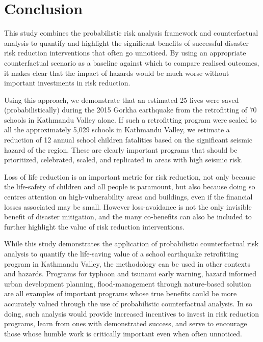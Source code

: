 \documentclass[utf8]{frontiersSCNS} %
\begin{document}
\section{Conclusion}
\label{section-conclusion}

This study combines the probabilistic risk analysis framework and counterfactual analysis to quantify and highlight the significant benefits of successful disaster risk reduction interventions that often go unnoticed. By using an appropriate counterfactual scenario as a baseline against which to compare realised outcomes, it makes clear that the impact of hazards would be much worse without important investments in risk reduction.

Using this approach, we demonstrate that an estimated 25 lives were saved (probabilistically) during the 2015 Gorkha earthquake from the retrofitting of 70 schools in Kathmandu Valley alone. If such a retrofitting program were scaled to all the approximately 5,029 schools in Kathmandu Valley, we estimate a reduction of 12 annual school children fatalities based on the significant seismic hazard of the region. These are clearly important programs that should be prioritized, celebrated, scaled, and replicated in areas with high seismic risk.

Loss of life reduction is an important metric for risk reduction, not only because the life-safety of children and all people is paramount, but also because doing so centres attention on high-vulnerability areas and buildings, even if the financial losses associated may be small. However loss-avoidance is not the only invisible benefit of disaster mitigation, and the many co-benefits can also be included to further highlight the value of risk reduction interventions.

While this study demonstrates the application of probabilistic counterfactual risk analysis to quantify the life-saving value of a school earthquake retrofitting program in Kathmandu Valley, the methodology can be used in other contexts and hazards. Programs for typhoon and tsunami early warning, hazard informed urban development planning, flood-management through nature-based solution are all examples of important programs whose true benefits could be more accurately valued through the use of probabilistic counterfactual analysis. In so doing, such analysis would provide increased incentives to invest in risk reduction programs, learn from ones with demonstrated success, and serve to encourage those whose humble work is critically important even when often unnoticed.
\end{document}
